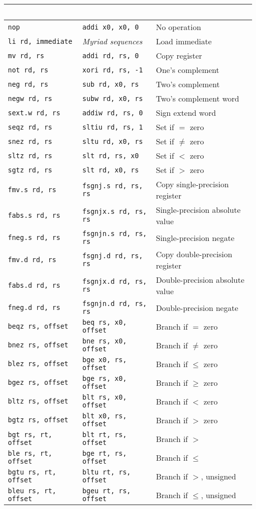 \begin{table}[h]
\begin{small}
\begin{center}
\begin{tabular}{l l l}
~\\
\hline
{\tt nop} & {\tt addi x0, x0, 0} & No operation \\
{\tt li rd, immediate} & {\em Myriad sequences} & Load immediate \\
{\tt mv rd, rs} & {\tt addi rd, rs, 0} & Copy register \\
{\tt not rd, rs} & {\tt xori rd, rs, -1} & One's complement \\
{\tt neg rd, rs} & {\tt sub rd, x0, rs} & Two's complement \\
{\tt negw rd, rs} & {\tt subw rd, x0, rs} & Two's complement word \\
{\tt sext.w rd, rs} & {\tt addiw rd, rs, 0} & Sign extend word \\
{\tt seqz rd, rs} & {\tt sltiu rd, rs, 1} & Set if $=$ zero \\
{\tt snez rd, rs} & {\tt sltu rd, x0, rs} & Set if $\neq$ zero \\
{\tt sltz rd, rs} & {\tt slt rd, rs, x0} & Set if $<$ zero \\
{\tt sgtz rd, rs} & {\tt slt rd, x0, rs} & Set if $>$ zero \\
\hline
{\tt fmv.s rd, rs} & {\tt fsgnj.s rd, rs, rs} & Copy single-precision register \\
{\tt fabs.s rd, rs} & {\tt fsgnjx.s rd, rs, rs} & Single-precision absolute value \\
{\tt fneg.s rd, rs} & {\tt fsgnjn.s rd, rs, rs} & Single-precision negate \\
{\tt fmv.d rd, rs} & {\tt fsgnj.d rd, rs, rs} & Copy double-precision register \\
{\tt fabs.d rd, rs} & {\tt fsgnjx.d rd, rs, rs} & Double-precision absolute value \\
{\tt fneg.d rd, rs} & {\tt fsgnjn.d rd, rs, rs} & Double-precision negate \\
\hline
{\tt beqz rs, offset} & {\tt beq rs, x0, offset} & Branch if $=$ zero \\
{\tt bnez rs, offset} & {\tt bne rs, x0, offset} & Branch if $\neq$ zero \\
{\tt blez rs, offset} & {\tt bge x0, rs, offset} & Branch if $\leq$ zero \\
{\tt bgez rs, offset} & {\tt bge rs, x0, offset} & Branch if $\geq$ zero \\
{\tt bltz rs, offset} & {\tt blt rs, x0, offset} & Branch if $<$ zero \\
{\tt bgtz rs, offset} & {\tt blt x0, rs, offset} & Branch if $>$ zero \\
\hline
{\tt bgt rs, rt, offset} & {\tt blt rt, rs, offset} & Branch if $>$ \\
{\tt ble rs, rt, offset} & {\tt bge rt, rs, offset} & Branch if $\leq$ \\
{\tt bgtu rs, rt, offset} & {\tt bltu rt, rs, offset} & Branch if $>$, unsigned \\
{\tt bleu rs, rt, offset} & {\tt bgeu rt, rs, offset} & Branch if $\leq$, unsigned \\
\hline


\end{tabular}
\end{center}
\end{small}
\end{table}
